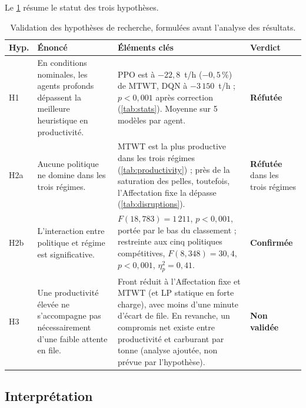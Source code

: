 \documentclass[11pt,a4paper]{article}
\newif\ifrevmarks
\newcommand{\revtag}[1]{\ifrevmarks\textsuperscript{\textcolor{red!70!black}{\scriptsize[#1]}}\fi}
\newcommand{\rev}[2]{\ifrevmarks{\color{revcolor}#2}\revtag{#1}\else#2\fi}
\newif\ifcorrmarks
\newcommand{\corr}[1]{\ifcorrmarks\textcolor{corrcolor}{#1}\else#1\fi}
\begin{document}
Le \cref{tab:hypotheses} résume le statut des trois hypothèses.

\begin{table}[H]
\caption{Validation des hypothèses de recherche, formulées avant l'analyse des résultats.}
\label{tab:hypotheses}
\footnotesize\setlength{\tabcolsep}{4pt}
\begin{tabularx}{\textwidth}{@{}lXXl@{}}
\toprule
\textbf{Hyp.} & \textbf{Énoncé} & \textbf{Éléments clés} & \textbf{Verdict} \\
\midrule
H1 & En conditions nominales, les agents profonds dépassent la meilleure heuristique en productivité. & \rev{T31}{PPO est à $-22{,}8$~t/h ($-0{,}5\,\%$) de MTWT, DQN à $-3\,150$~t/h ; $p<0{,}001$ après correction (\cref{tab:stats}). Moyenne sur 5 modèles par agent.} & \rev{T31}{\textbf{Réfutée}} \\[4pt]
\corr{H2a} & \corr{Aucune politique ne domine dans les trois régimes.} & \corr{MTWT est la plus productive dans les trois régimes (\cref{tab:productivity}) ; près de la saturation des pelles, toutefois, l'Affectation fixe la dépasse (\cref{tab:disruptions}).} & \corr{\textbf{Réfutée} dans les trois régimes} \\[4pt]
\corr{H2b} & \corr{L'interaction entre politique et régime est significative.} & \corr{$F(18,783)=1\,211$, $p<0{,}001$, portée par le bas du classement ; restreinte aux cinq politiques compétitives, $F(8,348)=30{,}4$, $p<0{,}001$, $\eta^2_p=0{,}41$.} & \corr{\textbf{Confirmée}} \\[4pt]
H3 & Une productivité élevée ne s'accompagne pas nécessairement d'une faible attente en file. & \rev{T31}{Front réduit à l'Affectation fixe et MTWT (et \corr{LP statique} en forte charge), avec moins d'une minute d'écart de file. En revanche, un compromis net existe entre productivité et carburant par tonne (analyse ajoutée, non prévue par l'hypothèse).} & \rev{T31}{\textbf{Non validée}} \\
\bottomrule
\end{tabularx}
\end{table}

\subsection{Interprétation}
\label{sec:interpretation}
\end{document}
